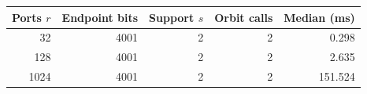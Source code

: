 \begin{tabular}{rrrrr}
\toprule
Ports $r$ & Endpoint bits & Support $s$ & Orbit calls & Median (ms)\\
\midrule
32 & 4001 & 2 & 2 & 0.298\\
128 & 4001 & 2 & 2 & 2.635\\
1024 & 4001 & 2 & 2 & 151.524\\
\bottomrule
\end{tabular}
